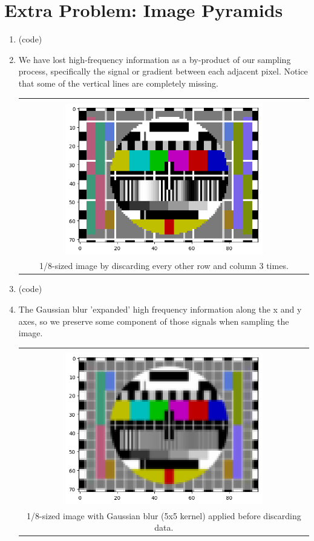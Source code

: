 \documentclass{article}
\begin{document}
\section*{Extra Problem: Image Pyramids}
\begin{enumerate}[label=(\roman*)]
\item %
(code)

\item %

We have lost high-frequency information as a by-product of our sampling process, specifically the signal or gradient between each adjacent pixel. Notice that some of the vertical lines are completely missing.
\begin{tabular}[t]{c}
	\hline \\
	\includegraphics[width=0.7\textwidth]{img/test_card_eighthscale.png} \\
	1/8-sized image by discarding every other row and column 3 times. \\
	\hline
\end{tabular}

\item %
(code)

\item %
The Gaussian blur 'expanded' high frequency information along the x and y axes, so we preserve some component of those signals when sampling the image.

\begin{tabular}[t]{c}
	\hline \\
	\includegraphics[width=0.7\textwidth]{img/test_card_blur_eighthscale.png} \\
	1/8-sized image with Gaussian blur (5x5 kernel) applied before discarding data. \\
	\hline
\end{tabular}


\end{enumerate}
\end{document}
